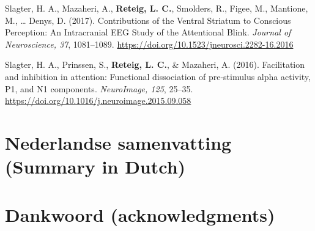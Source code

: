 \documentclass[11pt,]{memoir}
\begin{document}
Slagter, H. A., Mazaheri, A., \textbf{Reteig, L. C.}, Smolders, R., Figee, M., Mantione, M., \ldots{} Denys, D. (2017). Contributions of the Ventral Striatum to Conscious Perception: An Intracranial EEG Study of the Attentional Blink. \emph{Journal of Neuroscience, 37}, 1081--1089. \url{https://doi.org/10.1523/jneurosci.2282-16.2016}\newline

Slagter, H. A., Prinssen, S., \textbf{Reteig, L. C.}, \& Mazaheri, A. (2016). Facilitation and inhibition in attention: Functional dissociation of pre-stimulus alpha activity, P1, and N1 components. \emph{NeuroImage, 125}, 25--35. \url{https://doi.org/10.1016/j.neuroimage.2015.09.058}

\hypertarget{nederlandse-samenvatting-summary-in-dutch}{%
\chapter{Nederlandse samenvatting (Summary in Dutch)}\label{nederlandse-samenvatting-summary-in-dutch}}

\hypertarget{dankwoord-acknowledgments}{%
\chapter{Dankwoord (acknowledgments)}\label{dankwoord-acknowledgments}}

\printbibliography
\end{document}
